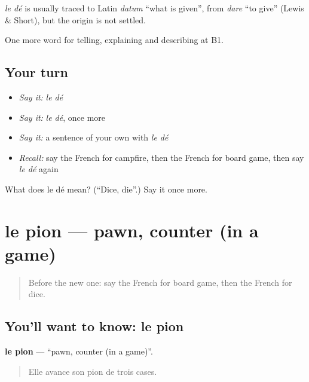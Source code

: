 \begin{cousinweb}
\emph{le dé} is usually traced to Latin \emph{datum} \textquotedblleft{}what is given\textquotedblright{}, from \emph{dare} \textquotedblleft{}to give\textquotedblright{} (Lewis \& Short), but the origin is not settled.
\end{cousinweb}

\begin{grammarlens}[title={What you've built}]
One more word for telling, explaining and describing at B1.
\end{grammarlens}

\subsection*{Your turn}
\begin{itemize}
\raggedright
  \item \emph{Say it:} \emph{le dé}
  \item \emph{Say it:} \emph{le dé}, once more
  \item \emph{Say it:} a sentence of your own with \emph{le dé}
  \item \emph{Recall:} say the French for campfire, then the French for board game, then say \emph{le dé} again
\end{itemize}

\begin{tcolorbox}[breakable,colback=teal!4,colframe=teal!35!black,title={Before you move on}]
What does le dé mean? (\textquotedblleft{}Dice, die\textquotedblright{}.) Say it once more.
\end{tcolorbox}
\section[le pion]{le pion — pawn, counter (in a game)}

\label{lesson:FR-C499-pion}



\begin{quote}
Before the new one: say the French for board game, then the French for dice.
\end{quote}

\subsection*{You'll want to know: le pion}
\textbf{le pion} — \textquotedblleft{}pawn, counter (in a game)\textquotedblright{}.

\begin{quote}
Elle avance son pion de trois cases.
\end{quote}

